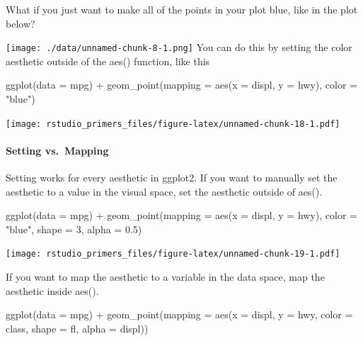 \documentclass[
]{article}
\newenvironment{Shaded}{\begin{snugshade}}{\end{snugshade}}
\newcommand{\AttributeTok}[1]{\textcolor[rgb]{0.77,0.63,0.00}{#1}}
\newcommand{\DecValTok}[1]{\textcolor[rgb]{0.00,0.00,0.81}{#1}}
\newcommand{\FloatTok}[1]{\textcolor[rgb]{0.00,0.00,0.81}{#1}}
\newcommand{\FunctionTok}[1]{\textcolor[rgb]{0.00,0.00,0.00}{#1}}
\newcommand{\NormalTok}[1]{#1}
\newcommand{\SpecialCharTok}[1]{\textcolor[rgb]{0.00,0.00,0.00}{#1}}
\newcommand{\StringTok}[1]{\textcolor[rgb]{0.31,0.60,0.02}{#1}}
\begin{document}
What if you just want to make all of the points in your plot blue, like
in the plot below?

\texttt{[image: ./data/unnamed-chunk-8-1.png]} You can do this by
setting the color aesthetic outside of the aes() function, like this

\begin{Shaded}
\begin{Highlighting}[]
\FunctionTok{ggplot}\NormalTok{(}\AttributeTok{data =}\NormalTok{ mpg) }\SpecialCharTok{+}
  \FunctionTok{geom\_point}\NormalTok{(}\AttributeTok{mapping =} \FunctionTok{aes}\NormalTok{(}\AttributeTok{x =}\NormalTok{ displ, }\AttributeTok{y =}\NormalTok{ hwy), }\AttributeTok{color =} \StringTok{"blue"}\NormalTok{)}
\end{Highlighting}
\end{Shaded}

\texttt{[image: rstudio\_primers\_files/figure-latex/unnamed-chunk-18-1.pdf]}

\hypertarget{setting-vs.-mapping}{%
\paragraph{Setting vs.~Mapping}\label{setting-vs.-mapping}}

Setting works for every aesthetic in ggplot2. If you want to manually
set the aesthetic to a value in the visual space, set the aesthetic
outside of aes().

\begin{Shaded}
\begin{Highlighting}[]
\FunctionTok{ggplot}\NormalTok{(}\AttributeTok{data =}\NormalTok{ mpg) }\SpecialCharTok{+}
  \FunctionTok{geom\_point}\NormalTok{(}\AttributeTok{mapping =} \FunctionTok{aes}\NormalTok{(}\AttributeTok{x =}\NormalTok{ displ, }\AttributeTok{y =}\NormalTok{ hwy), }\AttributeTok{color =} \StringTok{"blue"}\NormalTok{, }\AttributeTok{shape =} \DecValTok{3}\NormalTok{, }\AttributeTok{alpha =} \FloatTok{0.5}\NormalTok{)}
\end{Highlighting}
\end{Shaded}

\texttt{[image: rstudio\_primers\_files/figure-latex/unnamed-chunk-19-1.pdf]}

If you want to map the aesthetic to a variable in the data space, map
the aesthetic inside aes().

\begin{Shaded}
\begin{Highlighting}[]
\FunctionTok{ggplot}\NormalTok{(}\AttributeTok{data =}\NormalTok{ mpg) }\SpecialCharTok{+}
  \FunctionTok{geom\_point}\NormalTok{(}\AttributeTok{mapping =} \FunctionTok{aes}\NormalTok{(}\AttributeTok{x =}\NormalTok{ displ, }\AttributeTok{y =}\NormalTok{ hwy, }\AttributeTok{color =}\NormalTok{ class, }\AttributeTok{shape =}\NormalTok{ fl, }\AttributeTok{alpha =}\NormalTok{ displ))}
\end{Highlighting}
\end{Shaded}
\end{document}
